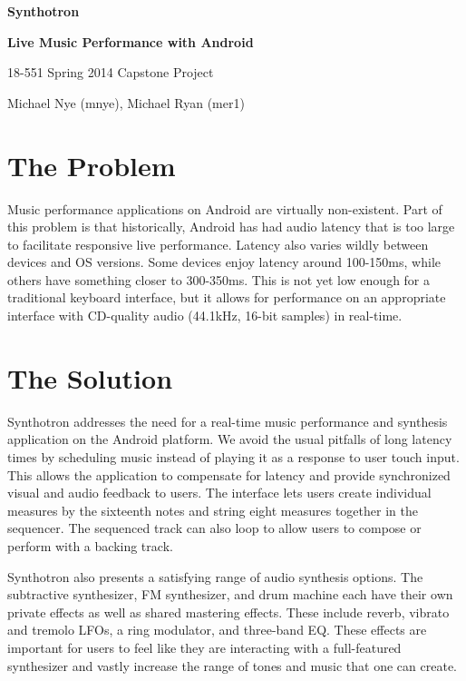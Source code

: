 \documentclass[letterpaper,12pt]{article}
\begin{document}
\begin{center}
    \par{\bf \LARGE Synthotron}
    \par{\bf \large Live Music Performance with Android}
    \par{\large 18-551 Spring 2014 Capstone Project}
    \par{\large Michael Nye (mnye), Michael Ryan (mer1)}
\end{center}



\section{The Problem}

Music performance applications on Android are virtually non-existent. Part of this problem is that historically, Android has had audio latency that is too large to facilitate responsive live performance. Latency also varies wildly between devices and OS versions. Some devices enjoy latency around 100-150ms, while others have something closer to 300-350ms. This is not yet low enough for a traditional keyboard interface, but it allows for performance on an appropriate interface with CD-quality audio (44.1kHz, 16-bit samples) in real-time.



\section{The Solution}
Synthotron addresses the need for a real-time music performance and synthesis application on the Android platform. We avoid the usual pitfalls of long latency times by scheduling music instead of playing it as a response to user touch input. This allows the application to compensate for latency and provide synchronized visual and audio feedback to users. The interface lets users create individual measures by the sixteenth notes and string eight measures together in the sequencer. The sequenced track can also loop to allow users to compose or perform with a backing track.

Synthotron also presents a satisfying range of audio synthesis options. The subtractive synthesizer, FM synthesizer, and drum machine each have their own private effects as well as shared mastering effects. These include reverb, vibrato and tremolo LFOs, a ring modulator, and three-band EQ. These effects are important for users to feel like they are interacting with a full-featured synthesizer and vastly increase the range of tones and music that one can create.
\end{document}
